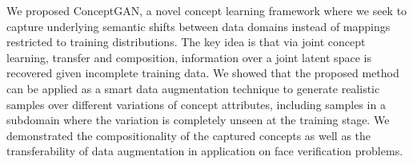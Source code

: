 \documentclass[10pt,twocolumn,letterpaper]{article}
\begin{document}
We proposed ConceptGAN, a novel concept learning framework where we seek to capture underlying semantic shifts between data domains instead of mappings restricted to training distributions. The key idea is that via joint concept learning, transfer and composition, information over a joint latent space is recovered given incomplete training data. We showed that the proposed method can be applied as a smart data augmentation technique to generate realistic samples over different variations of concept attributes, including samples in a subdomain where the variation is completely unseen at the training stage. We demonstrated the compositionality of the captured concepts as well as the transferability of data augmentation in application on face verification problems. %


{\small


}
\end{document}
